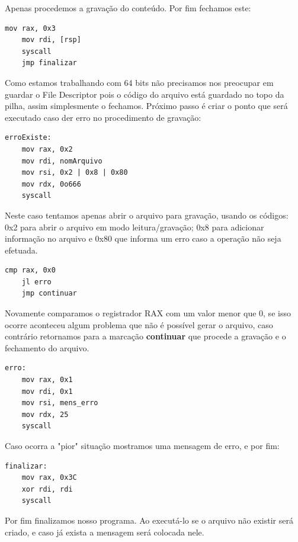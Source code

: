 Apenas procedemos a gravação do conteúdo. Por fim fechamos este:
\begin{lstlisting}[]
    mov rax, 0x3
    mov rdi, [rsp]
    syscall
    jmp finalizar
\end{lstlisting}

Como estamos trabalhando com 64 bits não precisamos nos preocupar em guardar o File Descriptor pois o código do arquivo está guardado no topo da pilha, assim simplesmente o fechamos. Próximo passo é criar o ponto que será executado caso der erro no procedimento de gravação:
\begin{lstlisting}[]
erroExiste:
    mov rax, 0x2  
    mov rdi, nomArquivo
    mov rsi, 0x2 | 0x8 | 0x80 
    mov rdx, 0o666
    syscall    
\end{lstlisting}

Neste caso tentamos apenas abrir o arquivo para gravação, usando os códigos: 0x2 para abrir o arquivo em modo leitura/gravação; 0x8 para adicionar informação no arquivo e 0x80 que informa um erro caso a operação não seja efetuada.
\begin{lstlisting}[]
    cmp rax, 0x0
    jl erro
    jmp continuar
\end{lstlisting}

Novamente comparamos o registrador RAX com um valor menor que 0, se isso ocorre aconteceu algum problema que não é possível gerar o arquivo, caso contrário retornamos para a marcação \textbf{continuar} que procede a gravação e o fechamento do arquivo.
\begin{lstlisting}[]
erro:
    mov rax, 0x1
    mov rdi, 0x1
    mov rsi, mens_erro
    mov rdx, 25
    syscall
\end{lstlisting}

Caso ocorra a "pior" situação mostramos uma mensagem de erro, e por fim:
\begin{lstlisting}[]
finalizar:
    mov rax, 0x3C
    xor rdi, rdi
    syscall
\end{lstlisting}

Por fim finalizamos nosso programa. Ao executá-lo se o arquivo não existir será criado, e caso já exista a mensagem será colocada nele.
\clearpage